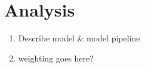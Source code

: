 \documentclass[12pt,oneside]{book}
\begin{document}
\chapter{Analysis}
\begin{enumerate}
  \item Describe model \& model pipeline
  \item weighting goes here?
\end{enumerate}



% 
% 
% 
% 
% 
% 
% 
% 


\end{document}
